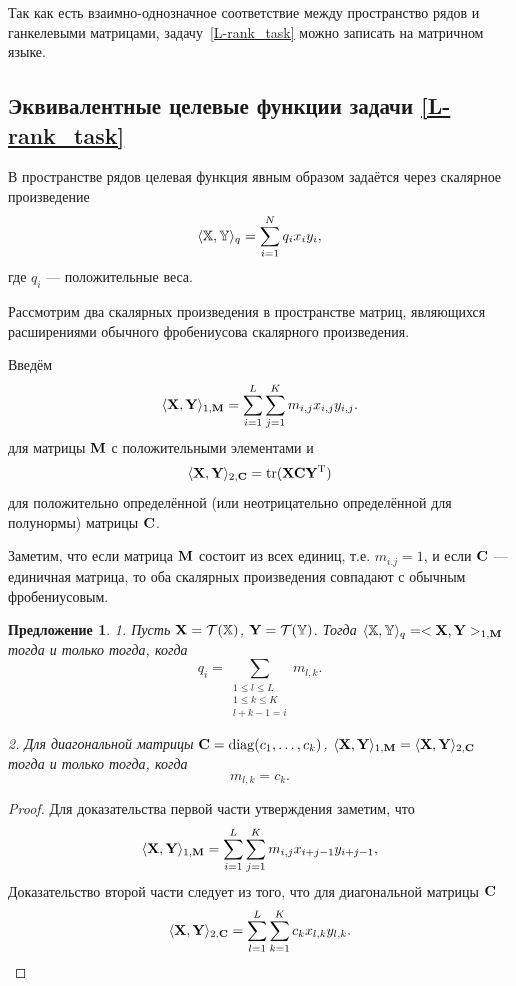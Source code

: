 \documentclass[12pt,a4paper,fleqn,leqno]{article}
\DeclareMathOperator{\tr}{tr}
\newtheorem{proposition}{Предложение}%
\begin{document}
Так как есть взаимно-однозначное соответствие между пространство рядов и ганкелевыми матрицами,
задачу~\eqref{L-rank_task} можно записать на матричном языке.

\subsection{Эквивалентные целевые функции задачи \eqref{L-rank_task}}
В пространстве рядов целевая функция явным образом задаётся через скалярное произведение
\begin{equation}
\label{eq:norm_ser}
    \langle\mathbb{X},\mathbb{Y}\rangle_q = \sum_{i = 1}^N q_i x_i y_i,
\end{equation}
где $q_i$ --- положительные веса.

Рассмотрим два скалярных произведения в пространстве матриц, являющихся расширениями
обычного фробениусова скалярного произведения.

Введём
\begin{equation}
\label{eq:norm1M}
    \langle\mathbf{X},\mathbf{Y}\rangle_{1,\mathbf{M}} = \sum_{i = 1}^L \sum_{j=1}^K m_{i,j} x_{i,j} y_{i,j}.
\end{equation}
для матрицы $\mathbf{M}$ с положительными элементами и
\begin{equation}
\label{eq:norm2S}
    \langle\bfX,\bfY\rangle_{2,\bfC} = \tr(\bfX \bfC \bfY^\rmT)
\end{equation}
для положительно определённой (или неотрицательно определённой для полунормы) матрицы $\mathbf{C}$.

Заметим, что если матрица $\mathbf{M}$ состоит из всех единиц, т.е. $m_{i.j}=1$,
и если $\mathbf{C}$ --- единичная матрица, то оба скалярных произведения совпадают
с обычным фробениусовым.

\begin{proposition}
\label{prop:equiv_tasks}
1. Пусть $\mathbf{X} = \mathcal{T}(\mathbb{X})$,  $\mathbf{Y} = \mathcal{T}(\mathbb{Y})$. Тогда $\langle\mathbb{X},\mathbb{Y}\rangle_q= <\mathbf{X},\mathbf{Y}>_{1,\mathbf{M}}$ тогда и только тогда, когда
\begin{equation}\label{qi_mi}
q_i = \sum_{\substack{1 \le l \le L \\ 1 \le k \le K \\ l+k-1=i}} m_{l,k}.
\end{equation}

2. Для диагональной матрицы $\mathbf{C}=\mathop{\mathrm{diag}}(c_1,\ldots,c_k)$, $\langle\mathbf{X},\mathbf{Y}\rangle_{1,\mathbf{M}}= \langle\mathbf{X},\mathbf{Y}\rangle_{2,\mathbf{C}}$ тогда и только тогда, когда
\begin{equation}\label{sk_mlk}
m_{l,k}=c_k.
\end{equation}
\end{proposition}
\begin{proof}
Для доказательства первой части утверждения заметим, что
\begin{equation*}
\langle \mathbf{X}, \mathbf{Y} \rangle_{1,\mathbf{M}} = \sum_{i = 1}^L \sum_{j = 1}^K m_{i,j} x_{i + j - 1} y_{i + j - 1},
\end{equation*}
Доказательство второй части следует из того, что для диагональной матрицы $\mathbf{C}$
\begin{equation*}
\langle \mathbf{X}, \mathbf{Y} \rangle_{2,\mathbf{C}} = \sum_{l=1}^L \sum_{k=1}^K c_k x_{l,k} y_{l, k}.
\end{equation*}
\end{proof}
\end{document}
